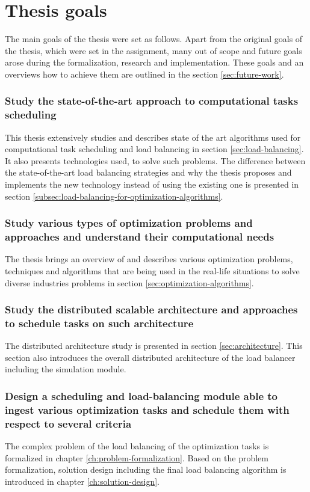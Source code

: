\section{Thesis goals}\label{sec:thesis-goals}
The main goals of the thesis were set as follows.
Apart from the original goals of the thesis,
which were set in the assignment,
many out of scope and future goals arose during the formalization, research and implementation.
These goals and an overviews how to achieve them are outlined in the section \ref{sec:future-work}.

\subsubsection{Study the state-of-the-art approach to computational tasks scheduling}
This thesis extensively studies and describes state of the art algorithms used for computational task scheduling
and load balancing in section \ref{sec:load-balancing}. 
It also presents technologies used, to solve such problems.
The difference between the state-of-the-art load balancing strategies
and why the thesis proposes and implements the new technology instead of using the existing one
is presented in section \ref{subsec:load-balancing-for-optimization-algorithms}.

\subsubsection{Study various types of optimization problems and approaches and understand their computational needs}
The thesis brings an overview of and describes various optimization problems, techniques and algorithms 
that are being used in the real-life situations to solve diverse industries problems 
in section \ref{sec:optimization-algorithms}.

\subsubsection{Study the distributed scalable architecture and approaches to schedule tasks on such architecture}

The distributed architecture study is presented in section \ref{sec:architecture}.
This section also introduces the overall distributed architecture of the load balancer
including the simulation module.

\subsubsection{Design a scheduling and load-balancing module able to ingest various optimization tasks and schedule them with respect to several criteria}
The complex problem of the load balancing of the optimization tasks is formalized in chapter \ref{ch:problem-formalization}.
Based on the problem formalization,
solution design including the final load balancing algorithm is introduced in chapter \ref{ch:solution-design}.

